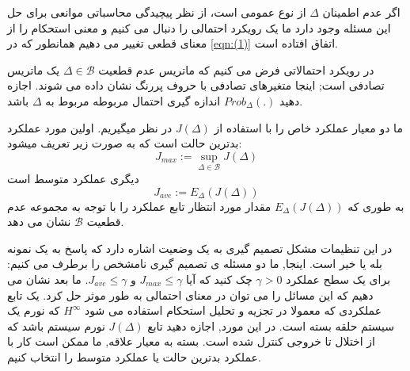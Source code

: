 \documentclass[12pt]{article} %
\begin{document}
	\par
	اگر عدم اطمینان
	$\Delta$
	از نوع عمومی است، از نظر پیچیدگی محاسباتی موانعی برای حل این مسئله وجود دارد
	ما یک رویکرد احتمالی را دنبال می کنیم و معنی استحکام را از معنای قطعی  تغییر می دهیم
	همانطور که در \ref{eqn:(1)} اتفاق افتاده است.
	\par
	در رویکرد احتمالاتی فرض می کنیم که ماتریس عدم قطعیت
	$\Delta \in \mathscr{B}$ 
	یک ماتریس تصادفی است;
	اینجا متغیرهای تصادفی
	با حروف پررنگ نشان داده می شوند.
	اجازه دهید
	$Prob_{\Delta}(.)$
	اندازه گیری احتمال مربوطه مربوط به
	$\Delta$
	باشد.
	\par
	ما دو معیار عملکرد خاص را با استفاده از
	$J(\Delta )$
	در نظر میگیریم.
	اولین مورد عملکرد بدترین حالت است که به صورت زیر تعریف میشود:
	\begin{equation} 	
	   J_{max}:= \sup_{\Delta \in \mathscr{B} }J(\Delta ) 
   \end{equation}
   دیگری عملکرد متوسط است
   \begin{equation*} 	
	   J_{ave}:= E_{\Delta}(J(\Delta )) 
   \end{equation*}
   به طوری که 
   $E_{\Delta}(J(\Delta ))$
   مقدار مورد انتظار تابع عملکرد را با توجه به مجموعه عدم قطعیت
   $\mathscr{B}$
   نشان می دهد.
   \par
	در این تنظیمات مشکل تصمیم گیری به یک وضعیت اشاره دارد
	که پاسخ به یک نمونه بله یا خیر است.
	اینجا,
	ما دو مسئله ی تصمیم گیری نامشخص را برطرف می کنیم:
	برای یک سطح عملکرد
	$\gamma > 0$
	چک کنید که آیا
	$J_{max} \leq \gamma $ و $J_{ave} \leq \gamma$.
	ما بعد نشان می دهیم که این مسائل را می توان در معنای احتمالی به طور  موثر حل کرد.
	یک تابع عملکردی که معمولا در تجزیه و تحلیل استحکام استفاده می شود
	$H^{\infty }$
	که نورم یک سیستم حلقه بسته است.
	در
	این مورد, اجازه دهید تابع
	$J(\Delta)$
	نورم سیستم باشد که
	از اختلال تا خروجی کنترل شده است.
	بسته به
	معیار علاقه, ما ممکن است کار با
	عملکرد بدترین حالت یا عملکرد متوسط را انتخاب کنیم.
\end{document}
